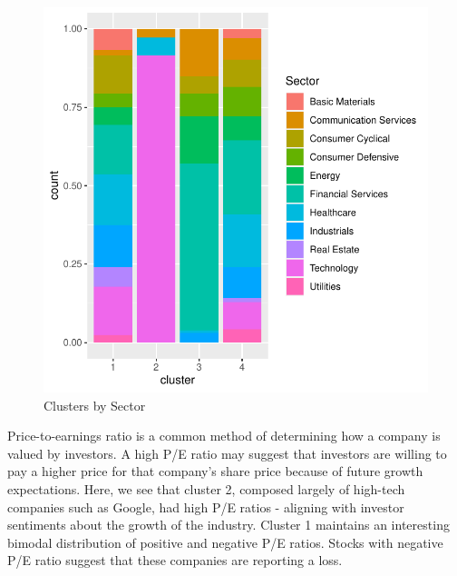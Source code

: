 \documentclass[11pt,]{article}
\begin{document}
\begin{figure}

{\centering \includegraphics{stock_analysis_files/figure-latex/sector-1} 

}

\caption{Clusters by Sector}\label{fig:sector}
\end{figure}

Price-to-earnings ratio is a common method of determining how a company
is valued by investors. A high P/E ratio may suggest that investors are
willing to pay a higher price for that company's share price because of
future growth expectations. Here, we see that cluster 2, composed
largely of high-tech companies such as Google, had high P/E ratios -
aligning with investor sentiments about the growth of the industry.
Cluster 1 maintains an interesting bimodal distribution of positive and
negative P/E ratios. Stocks with negative P/E ratio suggest that these
companies are reporting a loss.
\end{document}
